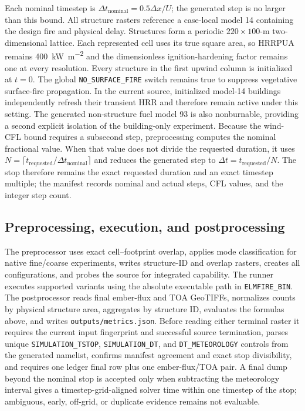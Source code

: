Each nominal timestep is \(\Delta t_{\mathrm{nominal}}=0.5\Delta x/U\); the generated step is no larger than this bound. All structure rasters reference
a case-local model 14 containing the design fire and physical delay. Structures
form a periodic \(220\times100\)-m two-dimensional lattice. Each represented
cell uses its true square area, so HRRPUA remains \SI{400}{kW.m^{-2}} and the
dimensionless ignition-hardening factor remains one at every resolution. Every
structure in the first upwind column is initialized at \(t=0\).
The global \texttt{NO\_SURFACE\_FIRE} switch remains true to suppress vegetative surface-fire propagation.  In the current source, initialized model-14 buildings independently refresh their transient HRR and therefore remain active under this setting.  The generated non-structure fuel model 93 is also nonburnable, providing a second explicit isolation of the building-only experiment.
Because the wind-CFL bound requires a subsecond step, preprocessing computes the
nominal fractional value.  When that value does not divide the requested duration,
it uses \(N=\lceil t_{\mathrm{requested}}/\Delta t_{\mathrm{nominal}}\rceil\)
and reduces the generated step to
\(\Delta t=t_{\mathrm{requested}}/N\).  The stop therefore remains the exact
requested duration and an exact timestep multiple; the manifest records nominal
and actual steps, CFL values, and the integer step count.

\subsection{Preprocessing, execution, and postprocessing}

The preprocessor uses exact cell--footprint overlap, applies mode classification
for native fine/coarse experiments, writes structure-ID and overlap rasters,
creates all configurations, and probes the source for integrated capability.
The runner executes supported variants using the absolute executable path in
\texttt{ELMFIRE\_BIN}. The postprocessor reads final ember-flux and TOA
GeoTIFFs, normalizes counts by physical structure area, aggregates by structure
ID, evaluates the formulas above, and writes \texttt{outputs/metrics.json}. Before reading either terminal raster it requires the current input fingerprint and successful source termination, parses unique \texttt{SIMULATION\_TSTOP}, \texttt{SIMULATION\_DT}, and \texttt{DT\_METEOROLOGY} controls from the generated namelist, confirms manifest agreement and exact stop divisibility, and requires one ledger final row plus one ember-flux/TOA pair. A final dump beyond the nominal stop is accepted only when subtracting the meteorology interval gives a timestep-grid-aligned solver time within one timestep of the stop; ambiguous, early, off-grid, or duplicate evidence remains not evaluable.

